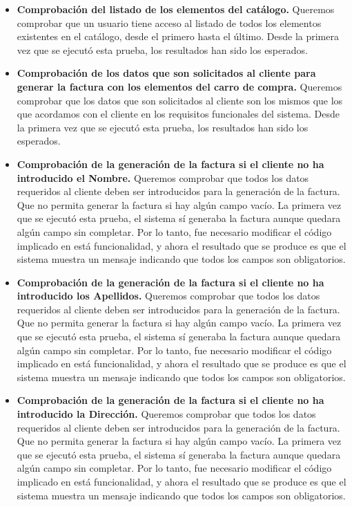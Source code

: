 \begin{itemize}
	\begin{itemize}
	\item \textbf{Comprobación del listado de los elementos del catálogo.} Queremos comprobar que un usuario tiene acceso al listado de todos los elementos existentes en el catálogo, desde el primero hasta el último. Desde la primera vez que se ejecutó esta prueba, los resultados han sido los esperados.
	\item \textbf{Comprobación de los datos que son solicitados al cliente para generar la factura con los elementos del carro de compra.} Queremos comprobar que los datos que son solicitados al cliente son los mismos que los que acordamos con el cliente en los requisitos funcionales del sistema. Desde la primera vez que se ejecutó esta prueba, los resultados han sido los esperados.
	\item \textbf{Comprobación de la generación de la factura si el cliente no ha introducido el Nombre.} Queremos comprobar que todos los datos requeridos al cliente deben ser introducidos para la generación de la factura. Que no permita generar la factura si hay algún campo vacío. La primera vez que se ejecutó esta prueba, el sistema sí generaba la factura aunque quedara algún campo sin completar. Por lo tanto, fue necesario modificar el código implicado en está funcionalidad, y ahora el resultado que se produce es que el sistema muestra un mensaje indicando que todos los campos son obligatorios.
	\item \textbf{Comprobación de la generación de la factura si el cliente no ha introducido los Apellidos.} Queremos comprobar que todos los datos requeridos al cliente deben ser introducidos para la generación de la factura. Que no permita generar la factura si hay algún campo vacío. La primera vez que se ejecutó esta prueba, el sistema sí generaba la factura aunque quedara algún campo sin completar. Por lo tanto, fue necesario modificar el código implicado en está funcionalidad, y ahora el resultado que se produce es que el sistema muestra un mensaje indicando que todos los campos son obligatorios.
	\item \textbf{Comprobación de la generación de la factura si el cliente no ha introducido la Dirección.} Queremos comprobar que todos los datos requeridos al cliente deben ser introducidos para la generación de la factura. Que no permita generar la factura si hay algún campo vacío. La primera vez que se ejecutó esta prueba, el sistema sí generaba la factura aunque quedara algún campo sin completar. Por lo tanto, fue necesario modificar el código implicado en está funcionalidad, y ahora el resultado que se produce es que el sistema muestra un mensaje indicando que todos los campos son obligatorios.

\end{itemize}
\end{itemize}
